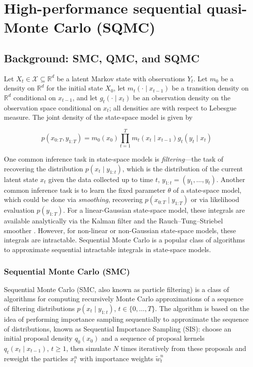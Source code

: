 \chapter{High-performance sequential quasi-Monte Carlo (SQMC)}
\label{ch:sqmc}

\section{Background: SMC, QMC, and SQMC}
\label{sec:background}

Let $X_t \in \mathcal{X} \subseteq \mathbb{R}^d$ be a latent Markov state with observations $Y_t$. Let $m_0$ be a density on $\mathbb{R}^d$ for the initial state $X_0$, let $m_t(\cdot \mid x_{t-1})$ be a transition density on $\mathbb{R}^d$ conditional on $x_{t-1}$, and let $g_t(\cdot \mid x_t)$ be an observation density on the observation space conditional on $x_t$; all densities are with respect to Lebesgue measure. The joint density of the state-space model is given by

\begin{equation}
\label{eq:state-space-model}
p(x_{0:T}, y_{1:T}) = m_0(x_0) \prod_{t=1}^T m_t(x_t \mid x_{t-1}) g_t(y_t \mid x_t)
\end{equation}

One common inference task in state-space models is \textit{filtering}---the task of recovering the distribution $p(x_{t} \mid y_{1:t})$, which is the distribution of the current latent state $x_t$ given the data collected up to time $t$, $y_{1:t} = (y_1, \ldots, y_t)$. Another common inference task is to learn the fixed parameter $\theta$ of a state-space model, which could be done via \textit{smoothing}, recovering $p(x_{0:T} \mid y_{1:T})$ or via likelihood evaluation $p(y_{1:T})$. For a linear-Gaussian state-space model, these integrals are available analytically via the Kalman filter and the Rauch--Tung--Striebel smoother \citep{kalmandbucy1961filtering,rauchtungstriebel1965}. However, for non-linear or non-Gaussian state-space models, these integrals are intractable. Sequential Monte Carlo is a popular class of algorithms to approximate sequential intractable integrals in state-space models.

\subsection{Sequential Monte Carlo (SMC)}
\label{sec:smc}

Sequential Monte Carlo (SMC, also known as particle filtering) is a class of algorithms for computing recursively Monte Carlo approximations of a sequence of filtering distributions $p(x_t \mid y_{1:t})$, $t \in \{0, \ldots, T\}$. The algorithm is based on the idea of performing importance sampling sequentially to approximate the sequence of distributions, known as Sequential Importance Sampling (SIS): choose an initial proposal density $q_0(x_0)$ and a sequence of proposal kernels $q_t(x_t \mid x_{t-1})$, $t \geq 1$, then simulate $N$ times iteratively from these proposals and reweight the particles $x_t^n$ with importance weights $\tilde{w}_t^n$

